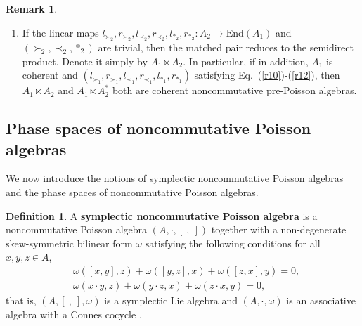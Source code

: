 \documentclass[12pt]{amsart}
\theoremstyle{definition}
\newtheorem{defi}[thm]{Definition}
\newtheorem{rmk}[thm]{Remark}
\begin{document}
\begin{rmk}
\begin{enumerate}
\begin{small}
\begin{align}
\\&\label{Dl3}(l_{\prec_1}(x)a)\prec_2 b=l_{\prec_1}(x)(a\cdot_2 b), \ \ \  (l_{\succ_1}(x)a)\prec_2 b=l_{\succ_1}(x)(a\prec_2 b),\ \ \
\\&\label{Dl4} l_{\succ_1}(x)(a\succ_2 b)=(l_{\cdot_1}(x)a)\succ_2 b, \ \ \ (r_{\prec_1}(x)a)\prec_2 b=a\prec_2(l_{\cdot_1}(x) b),
\\&\label{Dl5} (r_{\succ_1}(x)a)\prec_2 b=a\succ_2(l_{\prec_1}(x) b),\ \ \  a\succ_2l_{\succ}(x)b=r_{\cdot}(x)a\succ_2 b,
\\&\label{Dl6} r_{\prec_1}(x)(a\prec_2 b)=a\prec_2(r_{\cdot_1}(x) b), \ \ \ r_{\prec_1}(x)(a\succ_2 b)=a\succ_2(r_{\prec_1}(x)b),
\\&\label{Dl7} a\succ_2(r_{\succ_1}(x)b)=r_{\succ_1}(x)(a\cdot_2 b).
\end{align}\end{small}
Then $(A_{2},l_{\succ_1},r_{\succ_1},l_{\prec_1},r_{\prec_1},l_{\ast_1},r_{\ast_1})$ is called
  an {\bf A-noncommutative pre-Poisson algebra}. If only Eqs.~(\ref{Dl1})-(\ref{Dl2}) are satisfied, $(A_{2},l_{\ast_1},r_{\ast_1})$ is called
  an {\bf A-pre-Lie algebra}. If only Eqs.~(\ref{Dl3})-(\ref{Dl7}) are satisfied, $(A_{2},l_{\succ_1},r_{\succ_1},l_{\prec_1},r_{\prec_1})$ is called
   an {\bf  A-dendriform algebra}.  A-dendriform algebra is named an action of $A_1$ on $A_{2}$ in \cite{Wa}.
  \item If the linear maps
 $l_{\succ_2},r_{\succ_2},l_{\prec_2},r_{\prec_2},l_{\ast_2},r_{\ast_2}: A_{2}\rightarrow \text{End}(A_1)$
  and $(\succ_{2},\prec_{2},\ast_2)$ are trivial, 
 then the matched pair 
reduces to the semidirect product. Denote it simply by $A_{1}\ltimes A_2$. In particular, if in addition, $A_1$ is coherent
and $(l_{\succ_1},r_{\succ_1},l_{\prec_1},r_{\prec_1},l_{\ast_1},r_{\ast_1})$ satisfying Eq.~(\ref{r10})-(\ref{r12}), 
then $A_1\ltimes A_2$ and $A_1\ltimes A_2^{*}$ both are coherent noncommutative pre-Poisson algebras.
  \end{enumerate}
\end{rmk}
\subsection{Phase spaces of noncommutative Poisson algebras}
We now introduce the notions of symplectic noncommutative Poisson algebras and the phase spaces of noncommutative Poisson algebras.

\begin{defi} A {\bf symplectic noncommutative Poisson algebra} is a noncommutative Poisson algebra $(A,\cdot, [ \ , \ ])$
together with a non-degenerate skew-symmetric bilinear form $\omega$ satisfying the following conditions for all $x,y,z\in A$,
\begin{align}&
\label{Bs1}\omega([x,y],z)+\omega([y,z],x)+\omega([z,x],y)=0,\\&
\label{Bs2}\omega (x\cdot y,z)+\omega (y\cdot z,x)+\omega (z\cdot x,y)=0,
\end{align}
that is, $(A, [ \ , \ ],\omega)$
is a symplectic Lie algebra \cite{B1} and $(A,\cdot,\omega)$ is an associative algebra with a Connes cocycle \cite{B2}.
\end{defi}
\end{document}
